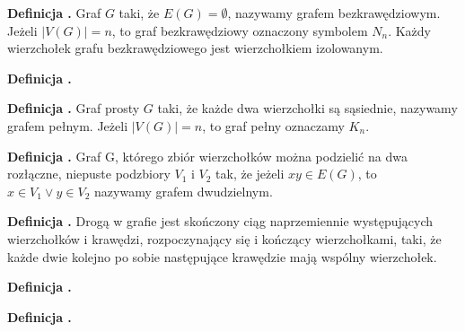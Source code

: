 \noindent
\textbf{Definicja \graphDefinitionIndex.}
\incrementGraphDefinitionIndex
Graf $G$ taki, że $E(G) = \emptyset$, nazywamy grafem bezkrawędziowym. Jeżeli $|V(G)| = n$, to graf bezkrawędziowy oznaczony symbolem $N_n$.
Każdy wierzchołek grafu bezkrawędziowego jest wierzchołkiem izolowanym.

\noindent
\textbf{Definicja \graphDefinitionIndex.}
\incrementGraphDefinitionIndex

\noindent
\textbf{Definicja \graphDefinitionIndex.}
\incrementGraphDefinitionIndex
Graf prosty $G$ taki, że każde dwa wierzchołki są sąsiednie, nazywamy grafem pełnym.
Jeżeli $|V(G)| = n$, to graf pełny oznaczamy $K_n$.

\noindent
\textbf{Definicja \graphDefinitionIndex.}
\incrementGraphDefinitionIndex
Graf G, którego zbiór wierzchołków można podzielić na dwa rozłączne, niepuste podzbiory $V_1$ i $V_2$ tak,
że jeżeli $xy \in E(G)$, to $x \in V_1 \vee y \in V_2$ nazywamy grafem dwudzielnym.

\noindent
\textbf{Definicja \graphDefinitionIndex.}
\incrementGraphDefinitionIndex
Drogą w grafie jest skończony ciąg naprzemiennie występujących wierzchołków i krawędzi, rozpoczynający się
i kończący wierzchołkami, taki, że każde dwie kolejno po sobie następujące krawędzie mają wspólny wierzchołek.

\noindent
\textbf{Definicja \graphDefinitionIndex.}
\incrementGraphDefinitionIndex

\noindent
\textbf{Definicja \graphDefinitionIndex.}
\incrementGraphDefinitionIndex
